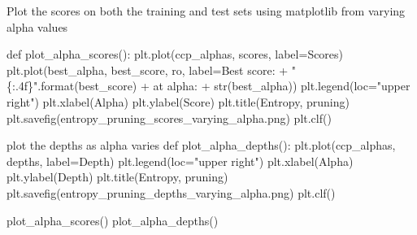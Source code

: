 \documentclass[
  letterpaper,
  DIV=11,
  numbers=noendperiod]{scrartcl}
\newenvironment{Shaded}{\begin{snugshade}}{\end{snugshade}}
\newcommand{\BuiltInTok}[1]{\textcolor[rgb]{0.00,0.23,0.31}{#1}}
\newcommand{\CommentTok}[1]{\textcolor[rgb]{0.37,0.37,0.37}{#1}}
\newcommand{\KeywordTok}[1]{\textcolor[rgb]{0.00,0.23,0.31}{#1}}
\newcommand{\NormalTok}[1]{\textcolor[rgb]{0.00,0.23,0.31}{#1}}
\newcommand{\OperatorTok}[1]{\textcolor[rgb]{0.37,0.37,0.37}{#1}}
\newcommand{\SpecialCharTok}[1]{\textcolor[rgb]{0.37,0.37,0.37}{#1}}
\newcommand{\StringTok}[1]{\textcolor[rgb]{0.13,0.47,0.30}{#1}}
\begin{document}
\begin{Shaded}
\begin{Highlighting}[]
\CommentTok{\textquotesingle{}\textquotesingle{}\textquotesingle{}Plot the scores on both the training and test sets using matplotlib from varying alpha values\textquotesingle{}\textquotesingle{}\textquotesingle{}}

\KeywordTok{def}\NormalTok{ plot\_alpha\_scores():}
\NormalTok{    plt.plot(ccp\_alphas, scores, label}\OperatorTok{=}\StringTok{\textquotesingle{}Scores\textquotesingle{}}\NormalTok{)}
\NormalTok{    plt.plot(best\_alpha, best\_score, }\StringTok{\textquotesingle{}ro\textquotesingle{}}\NormalTok{, label}\OperatorTok{=}\StringTok{\textquotesingle{}Best score: \textquotesingle{}}
        \OperatorTok{+} \StringTok{"}\SpecialCharTok{\{:.4f\}}\StringTok{"}\NormalTok{.}\BuiltInTok{format}\NormalTok{(best\_score) }\OperatorTok{+} \StringTok{\textquotesingle{} at alpha: \textquotesingle{}} \OperatorTok{+} \BuiltInTok{str}\NormalTok{(best\_alpha))}
\NormalTok{    plt.legend(loc}\OperatorTok{=}\StringTok{"upper right"}\NormalTok{)}
\NormalTok{    plt.xlabel(}\StringTok{\textquotesingle{}Alpha\textquotesingle{}}\NormalTok{)}
\NormalTok{    plt.ylabel(}\StringTok{\textquotesingle{}Score\textquotesingle{}}\NormalTok{)}
\NormalTok{    plt.title(}\StringTok{\textquotesingle{}Entropy, pruning\textquotesingle{}}\NormalTok{)}
\NormalTok{    plt.savefig(}\StringTok{\textquotesingle{}entropy\_pruning\_scores\_varying\_alpha.png\textquotesingle{}}\NormalTok{)}
\NormalTok{    plt.clf()}

\CommentTok{\textquotesingle{}\textquotesingle{}\textquotesingle{}plot the depths as alpha varies\textquotesingle{}\textquotesingle{}\textquotesingle{}}
\KeywordTok{def}\NormalTok{ plot\_alpha\_depths():}
\NormalTok{    plt.plot(ccp\_alphas, depths, label}\OperatorTok{=}\StringTok{\textquotesingle{}Depth\textquotesingle{}}\NormalTok{)}
\NormalTok{    plt.legend(loc}\OperatorTok{=}\StringTok{"upper right"}\NormalTok{)}
\NormalTok{    plt.xlabel(}\StringTok{\textquotesingle{}Alpha\textquotesingle{}}\NormalTok{)}
\NormalTok{    plt.ylabel(}\StringTok{\textquotesingle{}Depth\textquotesingle{}}\NormalTok{)}
\NormalTok{    plt.title(}\StringTok{\textquotesingle{}Entropy, pruning\textquotesingle{}}\NormalTok{)}
\NormalTok{    plt.savefig(}\StringTok{\textquotesingle{}entropy\_pruning\_depths\_varying\_alpha.png\textquotesingle{}}\NormalTok{)}
\NormalTok{    plt.clf()}

\NormalTok{plot\_alpha\_scores()}
\NormalTok{plot\_alpha\_depths()}
\end{Highlighting}
\end{Shaded}
\end{document}
